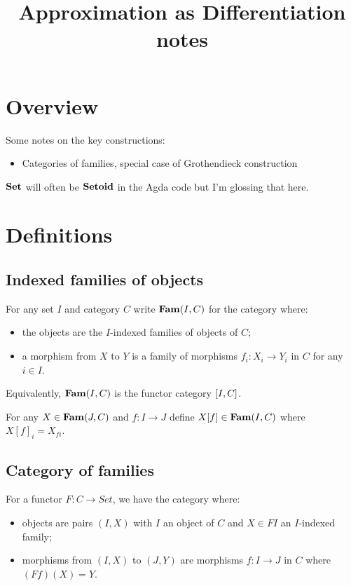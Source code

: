 \documentclass{acmart}
\begin{document}
\title{Approximation as Differentiation notes}
\maketitle

\section{Overview}

Some notes on the key constructions:
\begin{itemize}
\item Categories of families, special case of Grothendieck construction
\end{itemize}

\noindent $\mathbf{Set}$ will often be $\mathbf{Setoid}$ in the Agda code but I'm glossing that here.

\section{Definitions}

\subsection{Indexed families of objects}

For any set $I$ and category $C$ write $\mathbf{Fam}(I,C)$ for the category where:
\begin{itemize}
\item the objects are the $I$-indexed families of objects of $C$;
\item a morphism from $X$ to $Y$ is a family of morphisms $f_i: X_i \to Y_i$ in $C$ for any $i \in I$.
\end{itemize}

\noindent Equivalently, $\mathbf{Fam}(I,C)$ is the functor category $[I,C]$.

\begin{definition}
For any $X \in \mathbf{Fam}(J,C)$ and $f: I \to J$ define $X[f] \in \mathbf{Fam}(I,C)$ where $X[f]_i = X_{fi}$.
\end{definition}

\subsection{Category of families}

For a functor $F: C \to Set$, we have the category where:
\begin{itemize}
\item objects are pairs $(I, X)$ with $I$ an object of $C$ and $X \in FI$ an $I$-indexed family;
\item morphisms from $(I, X)$ to $(J, Y)$ are morphisms $f: I \to J$ in $C$ where $(Ff)(X) = Y$.
\end{itemize}
\end{document}
